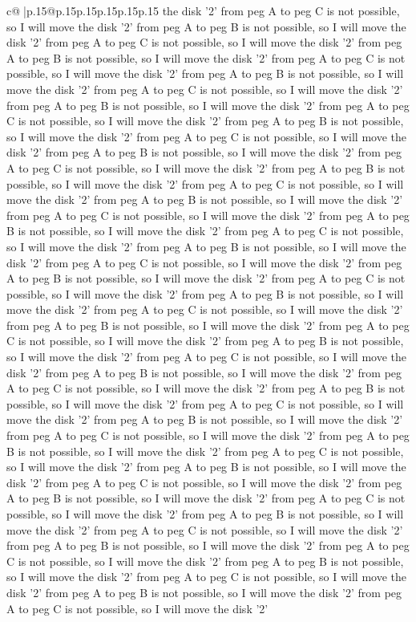 \documentclass{article}
\begin{document}
{\begin{supertabular}{c@{$\;$}|p{.15\linewidth}@{}p{.15\linewidth}p{.15\linewidth}p{.15\linewidth}p{.15\linewidth}p{.15\linewidth}}
{{{the disk '2' from peg A to peg C is not possible, so I will move the disk '2' from peg A to peg B is not possible, so I will move the disk '2' from peg A to peg C is not possible, so I will move the disk '2' from peg A to peg B is not possible, so I will move the disk '2' from peg A to peg C is not possible, so I will move the disk '2' from peg A to peg B is not possible, so I will move the disk '2' from peg A to peg C is not possible, so I will move the disk '2' from peg A to peg B is not possible, so I will move the disk '2' from peg A to peg C is not possible, so I will move the disk '2' from peg A to peg B is not possible, so I will move the disk '2' from peg A to peg C is not possible, so I will move the disk '2' from peg A to peg B is not possible, so I will move the disk '2' from peg A to peg C is not possible, so I will move the disk '2' from peg A to peg B is not possible, so I will move the disk '2' from peg A to peg C is not possible, so I will move the disk '2' from peg A to peg B is not possible, so I will move the disk '2' from peg A to peg C is not possible, so I will move the disk '2' from peg A to peg B is not possible, so I will move the disk '2' from peg A to peg C is not possible, so I will move the disk '2' from peg A to peg B is not possible, so I will move the disk '2' from peg A to peg C is not possible, so I will move the disk '2' from peg A to peg B is not possible, so I will move the disk '2' from peg A to peg C is not possible, so I will move the disk '2' from peg A to peg B is not possible, so I will move the disk '2' from peg A to peg C is not possible, so I will move the disk '2' from peg A to peg B is not possible, so I will move the disk '2' from peg A to peg C is not possible, so I will move the disk '2' from peg A to peg B is not possible, so I will move the disk '2' from peg A to peg C is not possible, so I will move the disk '2' from peg A to peg B is not possible, so I will move the disk '2' from peg A to peg C is not possible, so I will move the disk '2' from peg A to peg B is not possible, so I will move the disk '2' from peg A to peg C is not possible, so I will move the disk '2' from peg A to peg B is not possible, so I will move the disk '2' from peg A to peg C is not possible, so I will move the disk '2' from peg A to peg B is not possible, so I will move the disk '2' from peg A to peg C is not possible, so I will move the disk '2' from peg A to peg B is not possible, so I will move the disk '2' from peg A to peg C is not possible, so I will move the disk '2' from peg A to peg B is not possible, so I will move the disk '2' from peg A to peg C is not possible, so I will move the disk '2' from peg A to peg B is not possible, so I will move the disk '2' from peg A to peg C is not possible, so I will move the disk '2' from peg A to peg B is not possible, so I will move the disk '2' from peg A to peg C is not possible, so I will move the disk '2' from peg A to peg B is not possible, so I will move the disk '2' from peg A to peg C is not possible, so I will move the disk '2' from peg A to peg B is not possible, so I will move the disk '2' from peg A to peg C is not possible, so I will move the disk '2' }}}
\end{supertabular}}
\end{document}
